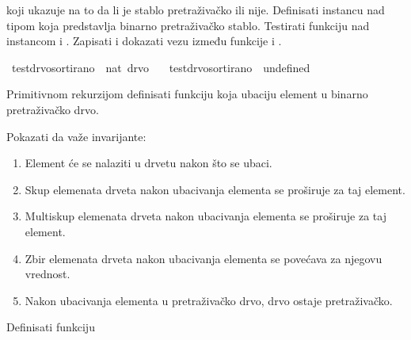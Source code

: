 \begin{isabellebody}
\begin{exercise}[subtitle=Binarno pretraživačko stablo.]
\begin{isamarkuptext}
      koji ukazuje na to da li je stablo pretraživačko ili nije.
      Definisati instancu  nad tipom  koja
      predstavlja binarno pretraživačko stablo. Testirati funkciju 
      nad instancom  i .
      Zapisati i dokazati vezu između funkcije  i .%
\end{isamarkuptext}\isamarkuptrue%
\isamarkupfalse%
\ test{\isacharunderscore}{\kern0pt}drvo{\isacharunderscore}{\kern0pt}sortirano\ {\isacharcolon}{\kern0pt}{\isacharcolon}{\kern0pt}\ {\isachardoublequoteopen}nat\ drvo{\isachardoublequoteclose}\ \isanewline
\ \ {\isachardoublequoteopen}test{\isacharunderscore}{\kern0pt}drvo{\isacharunderscore}{\kern0pt}sortirano\ {\isacharequal}{\kern0pt}\ undefined{\isachardoublequoteclose}%
\begin{isamarkuptext}%
Primitivnom rekurzijom definisati funkciju 
      koja ubaciju element u binarno pretraživačko drvo.%
\end{isamarkuptext}\isamarkuptrue%
%
\begin{isamarkuptext}%
Pokazati da važe invarijante:%
\end{isamarkuptext}\isamarkuptrue%
%
\begin{enumerate}
  \item Element će se nalaziti u drvetu nakon što se ubaci.
  \item Skup elemenata drveta nakon ubacivanja elementa se proširuje za taj element.
  \item Multiskup elemenata drveta nakon ubacivanja elementa se proširuje za taj element.
  \item Zbir elemenata drveta nakon ubacivanja elementa se povećava za njegovu vrednost.
  \item Nakon ubacivanja elementa u pretraživačko drvo, drvo ostaje pretraživačko.
\end{enumerate}
%
\begin{isamarkuptext}%
Definisati funkciju  

\end{isamarkuptext}
\end{exercise}
\end{isabellebody}
